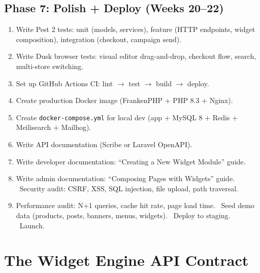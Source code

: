 \documentclass[11pt,a4paper]{article}
\begin{document}
\subsection{Phase 7: Polish + Deploy (Weeks 20--22)}

\begin{enumerate}[leftmargin=1.6em,itemsep=2pt]
  \item Write Pest 2 tests: unit (models, services), feature (HTTP
        endpoints, widget composition), integration (checkout,
        campaign send).
  \item Write Dusk browser tests: visual editor drag-and-drop, checkout
        flow, search, multi-store switching.
  \item Set up GitHub Actions CI: lint $\to$ test $\to$ build $\to$
        deploy.
  \item Create production Docker image (FrankenPHP + PHP 8.3 + Nginx).
  \item Create \texttt{docker-compose.yml} for local dev (app + MySQL
        8 + Redis + Meilisearch + Mailhog).
  \item Write API documentation (Scribe or Laravel OpenAPI).
  \item Write developer documentation: ``Creating a New Widget Module''
        guide.
  \item Write admin documentation: ``Composing Pages with Widgets''
        guide.
  \   Security audit: CSRF, XSS, SQL injection, file upload, path
        traversal.
  \item Performance audit: N+1 queries, cache hit rate, page load
        time.
  \   Seed demo data (products, posts, banners, menus, widgets).
  \   Deploy to staging.
  \   Launch.
\end{enumerate}

\section{The Widget Engine API Contract}\label{sec:widget-contract}
\end{document}
